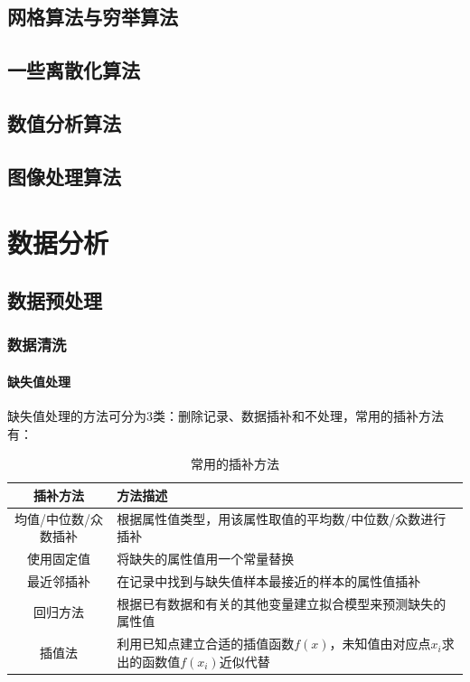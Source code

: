 \documentclass[openany]{progbookcn}
\begin{document}
\chapter{网格算法与穷举算法}
\chapter{一些离散化算法}
\chapter{数值分析算法}
\chapter{图像处理算法}


\part{数据分析}
\chapter{数据预处理}
\section{数据清洗}
\subsection{缺失值处理}
\indent 缺失值处理的方法可分为3类：删除记录、数据插补和不处理，常用的插补方法有：
\begin{table}[h]
\centering
\begin{tabular}{|c|l|}
\hline
{\bf 插补方法} & {\bf 方法描述}\\
\hline
均值/中位数/众数插补 & 根据属性值类型，用该属性取值的平均数/中位数/众数进行插补\\
\hline
使用固定值 & 将缺失的属性值用一个常量替换\\
\hline
最近邻插补 & 在记录中找到与缺失值样本最接近的样本的属性值插补\\
\hline
回归方法 & 根据已有数据和有关的其他变量建立拟合模型来预测缺失的属性值\\
\hline
插值法 & 利用已知点建立合适的插值函数$f(x)$，未知值由对应点$x_i$求出的函数值$f(x_i)$近似代替\\
\hline
\end{tabular}
\caption{常用的插补方法}
\end{table}
\end{document}

